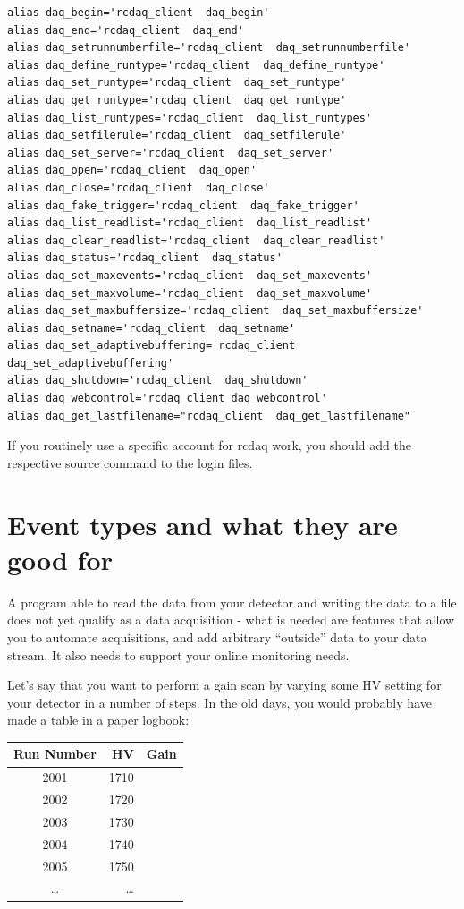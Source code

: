 \documentclass{article}[11pt]
\begin{document}
\begin{verbatim}
alias daq_begin='rcdaq_client  daq_begin'
alias daq_end='rcdaq_client  daq_end'
alias daq_setrunnumberfile='rcdaq_client  daq_setrunnumberfile'
alias daq_define_runtype='rcdaq_client  daq_define_runtype'
alias daq_set_runtype='rcdaq_client  daq_set_runtype'
alias daq_get_runtype='rcdaq_client  daq_get_runtype'
alias daq_list_runtypes='rcdaq_client  daq_list_runtypes'
alias daq_setfilerule='rcdaq_client  daq_setfilerule'
alias daq_set_server='rcdaq_client  daq_set_server'
alias daq_open='rcdaq_client  daq_open'
alias daq_close='rcdaq_client  daq_close'
alias daq_fake_trigger='rcdaq_client  daq_fake_trigger'
alias daq_list_readlist='rcdaq_client  daq_list_readlist'
alias daq_clear_readlist='rcdaq_client  daq_clear_readlist'
alias daq_status='rcdaq_client  daq_status'
alias daq_set_maxevents='rcdaq_client  daq_set_maxevents'
alias daq_set_maxvolume='rcdaq_client  daq_set_maxvolume'
alias daq_set_maxbuffersize='rcdaq_client  daq_set_maxbuffersize'
alias daq_setname='rcdaq_client  daq_setname'
alias daq_set_adaptivebuffering='rcdaq_client  daq_set_adaptivebuffering'
alias daq_shutdown='rcdaq_client  daq_shutdown'
alias daq_webcontrol='rcdaq_client daq_webcontrol'
alias daq_get_lastfilename="rcdaq_client  daq_get_lastfilename"
\end{verbatim}

If you routinely use a specific account for rcdaq work, you should add the 
respective source command to the login files.  


\section{Event types and what they are good for}

A program able to read the data from your detector and writing the data
to a file does not yet qualify as a data acquisition - what is needed
are features that allow you to automate acquisitions, and add
arbitrary ``outside'' data to your data stream. It also needs to
support your online monitoring needs.

Let's say that you want to perform a gain scan by varying some HV
setting for your detector in a number of steps. In the old days, you
would probably have made a table in a paper logbook: 

\begin{center}

\begin{tabular}{|c|r|r|}
\hline
Run Number & HV & Gain \\
\hline
\hline
    2001 & 1710 &  \\ \hline
    2002 & 1720 &  \\ \hline
    2003 & 1730 &  \\ \hline
    2004 & 1740 &  \\ \hline
    2005 & 1750 &  \\ \hline
    \dots & \dots &  \\ \hline
\hline
\end{tabular}
\end{center}
\end{document}
